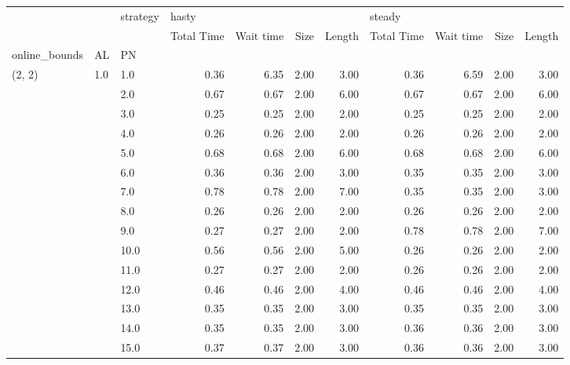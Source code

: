 \begin{tabular}{lllrrrrrrrr}
\toprule
       &     & strategy & \multicolumn{4}{l}{hasty} & \multicolumn{4}{l}{steady} \\
       &     & {} & Total Time & Wait time & Size & Length & Total Time & Wait time & Size & Length \\
online\_bounds & AL & PN &            &           &      &        &            &           &      &        \\
\midrule
(2, 2) & 1.0 & 1.0  &       0.36 &      6.35 & 2.00 &   3.00 &       0.36 &      6.59 & 2.00 &   3.00 \\
       &     & 2.0  &       0.67 &      0.67 & 2.00 &   6.00 &       0.67 &      0.67 & 2.00 &   6.00 \\
       &     & 3.0  &       0.25 &      0.25 & 2.00 &   2.00 &       0.25 &      0.25 & 2.00 &   2.00 \\
       &     & 4.0  &       0.26 &      0.26 & 2.00 &   2.00 &       0.26 &      0.26 & 2.00 &   2.00 \\
       &     & 5.0  &       0.68 &      0.68 & 2.00 &   6.00 &       0.68 &      0.68 & 2.00 &   6.00 \\
       &     & 6.0  &       0.36 &      0.36 & 2.00 &   3.00 &       0.35 &      0.35 & 2.00 &   3.00 \\
       &     & 7.0  &       0.78 &      0.78 & 2.00 &   7.00 &       0.35 &      0.35 & 2.00 &   3.00 \\
       &     & 8.0  &       0.26 &      0.26 & 2.00 &   2.00 &       0.26 &      0.26 & 2.00 &   2.00 \\
       &     & 9.0  &       0.27 &      0.27 & 2.00 &   2.00 &       0.78 &      0.78 & 2.00 &   7.00 \\
       &     & 10.0 &       0.56 &      0.56 & 2.00 &   5.00 &       0.26 &      0.26 & 2.00 &   2.00 \\
       &     & 11.0 &       0.27 &      0.27 & 2.00 &   2.00 &       0.26 &      0.26 & 2.00 &   2.00 \\
       &     & 12.0 &       0.46 &      0.46 & 2.00 &   4.00 &       0.46 &      0.46 & 2.00 &   4.00 \\
       &     & 13.0 &       0.35 &      0.35 & 2.00 &   3.00 &       0.35 &      0.35 & 2.00 &   3.00 \\
       &     & 14.0 &       0.35 &      0.35 & 2.00 &   3.00 &       0.36 &      0.36 & 2.00 &   3.00 \\
       &     & 15.0 &       0.37 &      0.37 & 2.00 &   3.00 &       0.36 &      0.36 & 2.00 &   3.00 \\

\end{tabular}
